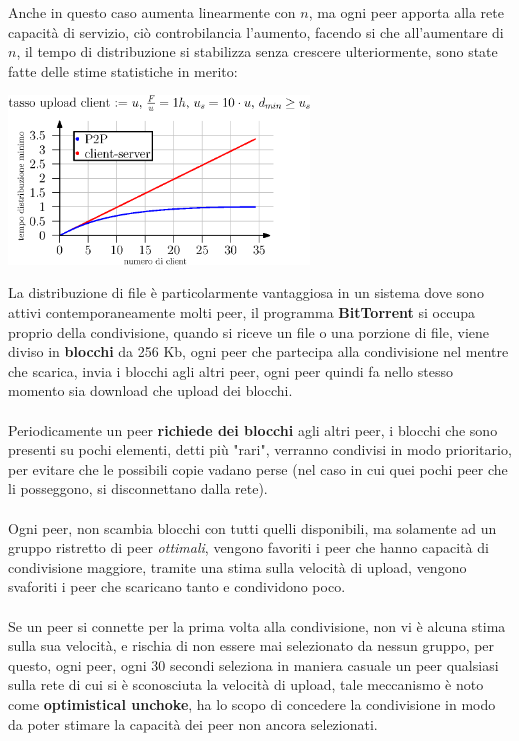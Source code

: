 \documentclass[12pt, letterpaper]{article}
\newcommand{\acc}{\\\hphantom{}\\}
\begin{document}
Anche in questo caso aumenta linearmente con $n$, ma ogni peer apporta alla rete capacità di servizio, 
ciò controbilancia l'aumento, facendo si che all'aumentare di $n$, il tempo di distribuzione si stabilizza 
senza crescere ulteriormente, sono state fatte delle stime statistiche in merito:\begin{center}
    \includegraphics[width=0.6\textwidth ]{images/p2pTime.eps}
\end{center}
La distribuzione di file è particolarmente vantaggiosa in un sistema dove sono attivi contemporaneamente 
molti peer, il programma \textbf{BitTorrent} si occupa proprio della condivisione, quando si riceve un 
file o una porzione di file, viene diviso in \textbf{blocchi} da 256 Kb, ogni peer che partecipa alla condivisione nel 
mentre che scarica, invia i blocchi agli altri peer, ogni peer quindi fa nello stesso momento sia 
download che upload dei blocchi.\acc 
Periodicamente un peer \textbf{richiede dei blocchi} agli altri peer, i blocchi che sono presenti su pochi elementi, detti 
più "rari", verranno condivisi in modo prioritario, per evitare che le possibili copie vadano perse (nel caso 
in cui quei pochi peer che li posseggono, si disconnettano dalla rete).\acc 
Ogni peer, non scambia blocchi con tutti quelli disponibili, ma solamente ad un gruppo ristretto di peer 
\textit{ottimali}, vengono favoriti i peer che hanno capacità di condivisione maggiore, tramite una 
stima sulla velocità di upload, vengono svaforiti i peer che 
scaricano tanto e condividono poco.\acc 
Se un peer si connette per la prima volta alla condivisione, non vi è alcuna stima sulla sua velocità, e rischia 
di non essere mai selezionato da nessun gruppo, per questo, ogni peer, ogni 30 secondi seleziona in 
maniera casuale un peer qualsiasi sulla rete di cui si è sconosciuta la 
velocità di upload, tale meccanismo è noto come \textbf{optimistical unchoke},
ha lo scopo di concedere la condivisione in modo da poter stimare la capacità dei peer non ancora selezionati.
\end{document}
